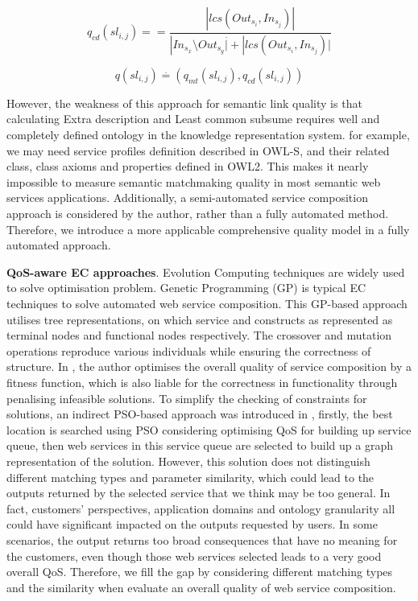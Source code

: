 \documentclass{llncs}
\begin{document}
\begin{equation}
q_{cd}(sl{_{i,j}})={=} \frac{|lcs(Out_{s_i},In_{s_j})|}{|In_{s_{x}} \setminus Out_{s{_y}} \stackrel{.}| +|lcs(Out_{s_i},In_{s_j})| }
 \label{equation2}
\end{equation}

\begin{equation}
\label{equation3}
q(sl{_{i,j}}) \stackrel{.}{=} (q_{mt}(sl_{i,j}), q_{cd}(sl_{i,j}))
\end{equation}

However, the weakness of this approach for semantic link quality is that calculating Extra description and Least common subsume requires well and completely defined ontology in the knowledge representation system. for example, we may need service profiles definition described in OWL-S, and their related class, class axioms and properties defined in OWL2. This makes it nearly impossible to measure semantic matchmaking quality in most semantic web services applications. Additionally, a semi-automated service composition approach is considered by the author, rather than a fully automated method. Therefore, we introduce a more applicable comprehensive quality model in a fully automated approach.

\textbf{QoS-aware EC approaches}. Evolution Computing techniques are widely used to solve optimisation problem. Genetic Programming (GP) \cite{da2015graphevol,da2016particle} is typical EC techniques to solve automated web service composition. This GP-based approach utilises tree representations, on which service and constructs as represented as terminal nodes and functional nodes respectively. The crossover and mutation operations reproduce various individuals while ensuring the correctness of structure. In \cite{yu2013adaptive}, the author optimises the overall quality of service composition by a fitness function, which is also liable for the correctness in functionality through penalising infeasible solutions. To simplify the checking of constraints for solutions, an indirect PSO-based approach was introduced in \cite{da2016particle}, firstly, the best location is searched using PSO considering optimising QoS for building up service queue, then web services in this service queue are selected to build up a graph representation of the solution. However, this solution does not distinguish different matching types and parameter similarity, which could lead to the outputs returned by the selected service that we think may be too general. In fact, customers' perspectives, application domains and ontology granularity all could have significant impacted on the outputs requested by users. In some scenarios, the output returns too broad consequences that have no meaning for the customers, even though those web services selected leads to a very good overall QoS. Therefore, we fill the gap by considering different matching types and the similarity when evaluate an overall quality of web service composition.
\end{document}
